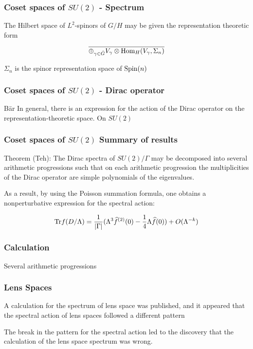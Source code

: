 \documentclass{beamer}
\def\Hom{{\rm Hom}}
\def\Spin{{\rm Spin}}
\def\Tr{{\rm Tr}}
\begin{document}
\begin{frame}
	\frametitle{Coset spaces of $SU(2)$ - Spectrum}
	\begin{block}{}
		The Hilbert space of $L^2$-spinors of $G/H$ may be given the representation theoretic form

		\[
			\overline{\oplus_{\gamma \in \hat{G}} V_{\gamma} \otimes \Hom_{H}(V_{\gamma}, \Sigma_{n})}
		\]
	\end{block}

	\pause

	\begin{block}{}
		$\Sigma_{n}$ is the spinor representation space of $\Spin(n)$
	\end{block}
\end{frame}

\begin{frame}
	\frametitle{Coset spaces of $SU(2)$ - Dirac operator}
	\begin{block}{B\"ar}
		In general, there is an expression for the action of the Dirac operator on the representation-theoretic space. On $SU(2)$
	\end{block}
\end{frame}

\begin{frame}
	\frametitle{Coset spaces of $SU(2)$ Summary of results}
	Theorem (Teh):
	The Dirac spectra of $SU(2) / \Gamma$ may be decomposed into several arithmetic progressions such that on each arithmetic progression the multiplicities of the Dirac operator are simple polynomials of the eigenvalues.

	As a result, by using the Poisson summation formula, one obtains a nonperturbative expression for the spectral action:

	\[
	\Tr f(D/\Lambda) = \frac{1}{|\Gamma|}(\Lambda^3 \widehat{f}^{(2)}(0) -\frac{1}{4} \Lambda \widehat{f}(0)) + O(\Lambda^{-k})
	\]
\end{frame}

\begin{frame}
	\frametitle{Calculation}
	Several arithmetic progressions
\end{frame}

\begin{frame}
	\frametitle{Lens Spaces}
	\begin{block}{}
		A calculation for the spectrum of lens space was published, and it appeared that the spectral action of lens spaces followed a different pattern
	\end{block}

	\pause

	\begin{block}{}
		The break in the pattern for the spectral action led to the discovery that the calculation of the lens space spectrum was wrong.
	\end{block}
\end{frame}
\end{document}
